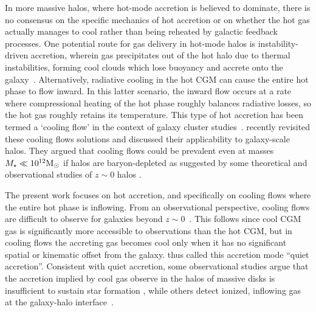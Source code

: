 \documentclass[fleqn,usenatbib]{mnras}
\newcommand{\msun}{{\rm M}_\odot}
\begin{document}
In more massive halos, where hot-mode accretion is believed to dominate, there is no consensus on the specific mechanics of hot accretion or on whether the hot gas actually manages to cool rather than being reheated by galactic feedback processes. 
One potential route for gas delivery in hot-mode halos is instability-driven accretion, wherein gas precipitates out of the hot halo due to thermal instabilities, forming cool clouds which lose buoyancy and accrete onto the galaxy~\citep[e.g.][]{Maller2004, Mccourt2012, Voit2015, Armillotta2016, Gronke2019a, Voit2021}.  
Alternatively, radiative cooling in the hot CGM can cause the entire hot phase to flow inward.
In this latter scenario, the inward flow occurs at a rate where compressional heating of the hot phase roughly balances radiative losses, so the hot gas roughly retains its temperature.
This type of hot accretion has been termed a `cooling flow' in the context of galaxy cluster studies~\citep[][see \citealt{McNamara2007} for a review]{Mathews1978, Cowie1980, Fabian1984, Balbus1988, Bertschinger1989}.
\cite{Stern2019, Stern2020a} recently revisited these cooling flows solutions and discussed their applicability to galaxy-scale halos.
They argued that cooling flows could be prevalent even at masses $M_{\star} \ll 10^{12}\msun$ if halos are baryon-depleted as suggested by some theoretical and observational studies of $z\sim0$ halos \citep[e.g.,][]{Bregman2018, Hafen2019}. 

The present work focuses on hot accretion, and specifically on cooling flows where the entire hot phase is inflowing.  
From an observational perspective, cooling flows are difficult to observe for galaxies beyond $z\sim0$~\citep{Putman2012}.
This follows since cool CGM gas is significantly more accessible to observations than the hot CGM, but in cooling flows the accreting gas becomes cool only when it has no significant spatial or kinematic offset from the galaxy.
\citeauthor{Putman2012} thus called this accretion mode ``quiet accretion''. 
Consistent with quiet accretion, some observational studies argue that the accretion implied by cool gas observe in the halos of massive disks is insufficient to sustain star formation \citep[e.g.][]{Sancisi2008}, while others detect ionized, inflowing gas at the galaxy-halo interface~\citep{Zheng2017}. 
\end{document}
